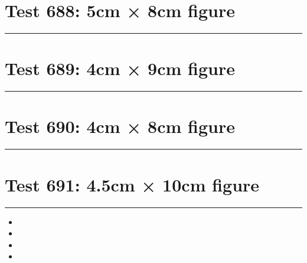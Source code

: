 \documentclass[a4paper,11pt]{article}
\begin{document}
\section*{Test 688: 5cm × 8cm figure}
\begin{swarmwrap}%
  \begin{minipage}[t]{5cm}
    \centering
    \rule{\linewidth}{8cm}
  \end{minipage}%
\end{swarmwrap}%
\swarmwrapnext
\lipsum[116]
\lipsum[117]
\lipsum[118]
\section*{Test 689: 4cm × 9cm figure}
\begin{swarmwrap}%
  \begin{minipage}[t]{4cm}
    \centering
    \rule{\linewidth}{9cm}
  \end{minipage}%
\end{swarmwrap}%
\swarmwrapnext
\lipsum[138]
\lipsum[139]
\lipsum[140]
\lipsum[141]
\lipsum[142]
\lipsum[143]
\section*{Test 690: 4cm × 8cm figure}
\begin{swarmwrap}%
  \begin{minipage}[t]{4cm}
    \centering
    \rule{\linewidth}{8cm}
  \end{minipage}%
\end{swarmwrap}%
\swarmwrapnext
\lipsum[94]
\lipsum[95]
\lipsum[96]
\section*{Test 691: 4.5cm × 10cm figure}
\begin{swarmwrap}%
  \begin{minipage}[t]{4cm}
    \centering
    \rule{\linewidth}{10cm}
  \end{minipage}%
\end{swarmwrap}
\begin{itemize}
  \item \swarmwrapnext\lipsum[28][1-4]
  \item \lipsum[30][1-3]
  \item \lipsum[31][1-3]
  \item \lipsum[32][1-3]
\end{itemize}
\end{document}
